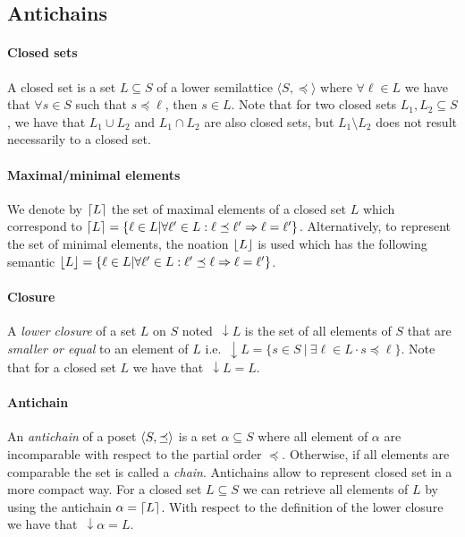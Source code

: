 \documentclass[letterpaper]{article}
\DeclarePairedDelimiter{\ceil}{\lceil}{\rceil}
\DeclarePairedDelimiter{\floor}{\lfloor}{\rfloor}
\DeclarePairedDelimiter{\tuple}{\langle}{\rangle}
\newcommand{\darrow}{\, \downarrow \!\!}
\theoremstyle{definition}
\begin{document}
\subsection{Antichains}

\paragraph{Closed sets}

A closed set is a set $L \subseteq S$
of a lower semilattice $\langle S, \preceq \rangle$
where $\forall \ell \in L$ we have that $\forall s \in S$ such that
$s \preceq \ell$, then $s \in L$.
Note that for two closed sets $L_1, L_2 \subseteq S$, we have that
$L_1 \cup L_2$ and $L_1 \cap L_2$ are also closed sets,
but $L_1 \setminus L_2$ does not result necessarily to a closed set.

\paragraph{Maximal/minimal elements} We denote by $\ceil{L}$
the set of maximal elements of a closed set $L$ which
correspond to $\ceil{L} =
\{ \ell \in L | \forall \ell' \in L : \ell \preceq \ell'
 \Rightarrow \ell = \ell' \}$. Alternatively, to represent the set of minimal
 elements, the noation $\floor{L}$ is used which has the following semantic
$\floor{L} = \{ \ell \in L | \forall \ell' \in L :  \ell' \preceq \ell
 \Rightarrow \ell = \ell' \}$.


\paragraph{Closure} A \textit{lower closure} of a set $L$ on $S$
noted $\darrow L$ is the set of all elements of $S$ that are
\textit{smaller or equal} to an element of $L$ i.e.
$\darrow L = \{ s \in S \ | \ \exists \ell \in L \cdot s \preceq \ell\}$.
Note that for a closed set $L$ we have that $\darrow L = L$.

\paragraph{Antichain}

An \textit{antichain} of a poset $\tuple{S, \preceq}$
is a set $\alpha \subseteq S$ where all element of $\alpha$
are incomparable with respect to the partial order $\preceq$.
Otherwise, if all elements are comparable the set is called a \textit{chain}.
Antichains allow to represent closed set in a more compact way.
For a closed set $L \subseteq S$ we can retrieve all elements of $L$ by using
the antichain $\alpha = \ceil{L}$. With respect
to the definition of the lower closure we have that $\darrow \alpha = L$.
\end{document}
